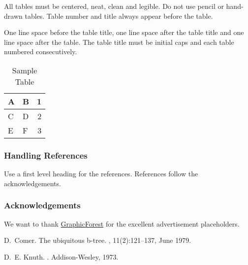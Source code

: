 \documentclass[letterpaper, twocolumn]{article}
\begin{document}
	All tables must be centered, neat, clean and legible. Do not use pencil
	or hand-drawn tables. Table number and title always appear before the
	table.
	
	One line space before the table title, one line space after the table
	title and one line space after the table. The table title must be
	initial caps and each table numbered consecutively.
	
	\begin{table}[ht]
		\begin{center}
			\caption{Sample Table}
			
			\bigskip
			
			\begin{tabular}{|l|l|r|}
				\hline
				A & B & 1\\ \hline
				C & D & 2\\
				E & F & 3\\ \hline
			\end{tabular}
		\end{center}
	\end{table}
	
	
	\subsubsection{Handling References}
	
	Use a first level heading for the references. References follow the
	acknowledgements.
	
	
	\subsubsection{Acknowledgements}
	
	We want to thank \href{https://www.freepik.com/author/graphicforest}{GraphicForest} for the excellent advertisement placeholders.
	
	
	
	
	
	\begin{thebibliography}{Com79}
		
		D.~Comer.
		\newblock The ubiquitous b-tree.
		, 11(2):121--137, June 1979.
		
		D.~E. Knuth.
		.
		\newblock Addison-Wesley, 1973.
		
	\end{thebibliography}
	
\end{document}
